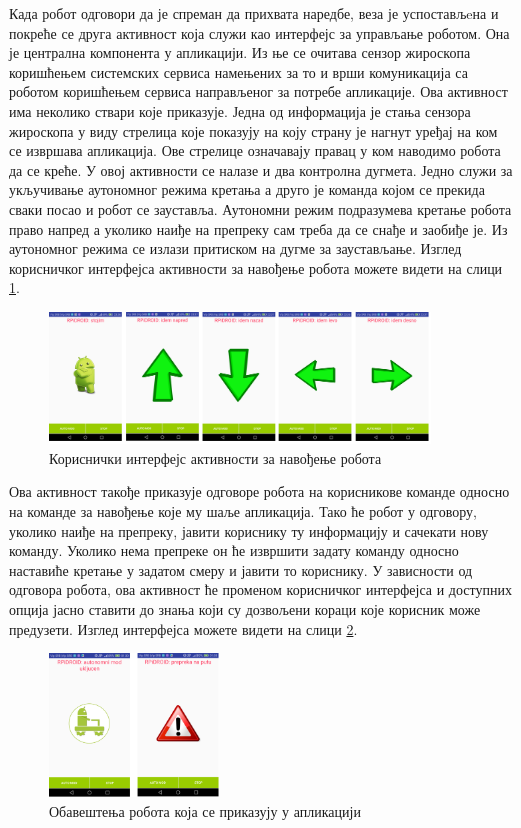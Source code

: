 \documentclass[12pt,oneside]{memoir}
\theoremstyle{remark}
\begin{document}
Када робот одговори да је спреман да прихвата наредбе, веза је успостављeна и покреће се друга активност која служи као интерфејс за управљање роботом. Она је централна компонента у апликацији. Из ње се очитава сензор жироскопа коришћењем системских сервиса намењених за то и врши комуникација са роботом коришћењем сервиса направљеног за потребе апликације. Ова активност има неколико ствари које приказује. Једна од информација је стања сензора жироскопа у виду стрелица које показују на коју страну је нагнут уређај на ком се извршава апликација. Ове стрелице означавају правац у ком наводимо робота да се креће. У овој активности се налазе и два контролна дугмета. Једно служи за укључивање аутономног режима кретања а друго је команда којом се прекида сваки посао и робот се зауставља. Аутономни режим подразумева кретање робота право напред а уколико наиђе на препреку сам треба да се снађе и заобиђе је. Из аутономног режима се излази притиском на дугме за заустављање. Изглед корисничког интерфејса активности за навођење робота можете видети на слици \ref{fig:uiactivity2}.

\begin{figure}[!ht]
\centering
\includegraphics[width=0.9\textwidth]{slike/activity2.png}
\caption{Кориснички интерфејс активности за навођење робота}
\label{fig:uiactivity2}
\end{figure}

Ова активност такође приказује одговоре робота на корисникове команде односно на команде за навођење које му шаље апликација. Тако ће робот у одговору, уколико наиђе на препреку, јавити кориснику ту информацију и сачекати нову команду. Уколико нема препреке он ће извршити задату команду односно наставиће кретање у задатом смеру и јавити то кориснику. У зависности од одговора робота, ова активност ће променом корисничког интерфејса и доступних опција јасно ставити до знања који су дозвољени кораци које корисник може предузети. Изглед интерфејса можете видети на слици \ref{fig:uiactivity21}.

\begin{figure}[!ht]
\centering
\includegraphics[width=0.4\textwidth]{slike/autoistop.png}
\caption{Обавештења робота која се приказују у апликацији}
\label{fig:uiactivity21}
\end{figure}
\end{document}
